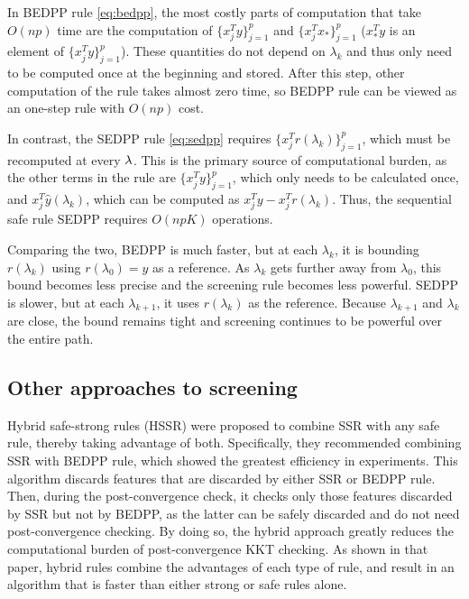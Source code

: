 In BEDPP rule \eqref{eq:bedpp}, the most costly parts of computation that take $O(np)$ time are the computation of $\{x_j^Ty\}_{j=1}^p$ and $\{x_j^Tx_*\}_{j=1}^p$ ($x_*^Ty$ is an element of $\{x_j^Ty\}_{j=1}^p$). These quantities do not depend on $\lambda_k$ and thus only need to be computed once at the beginning and stored. After this step, other computation of the rule takes almost zero time, so BEDPP rule can be viewed as an one-step rule with $O(np)$ cost.

In contrast, the SEDPP rule \eqref{eq:sedpp} requires $\{x_j^Tr(\lambda_k)\}_{j=1}^p$, which must be recomputed at every $\lambda$.  This is the primary source of computational burden, as the other terms in the rule are $\{x_j^Ty\}_{j=1}^p$, which only needs to be calculated once, and $x_j^T\hat{y}(\lambda_k)$, which can be computed as $x_j^Ty-x_j^Tr(\lambda_k)$. Thus, the sequential safe rule SEDPP requires $O(npK)$ operations.

Comparing the two, BEDPP is much faster, but at each $\lambda_k$, it is bounding $r(\lambda_k)$ using $r(\lambda_0)=y$ as a reference. As $\lambda_k$ gets further away from $\lambda_0$, this bound becomes less precise and the screening rule becomes less powerful. SEDPP is slower, but at each $\lambda_{k+1}$, it uses $r(\lambda_{k})$ as the reference. Because $\lambda_{k+1}$ and $\lambda_k$ are close, the bound remains tight and screening continues to be powerful over the entire path.

\subsection{Other approaches to screening}

Hybrid safe-strong rules (HSSR) \citep{Zeng2021} were proposed to combine SSR with any safe rule, thereby taking advantage of both. Specifically, they recommended combining SSR with BEDPP rule, which showed the greatest efficiency in experiments. This algorithm discards features that are discarded by either SSR or BEDPP rule. Then, during the post-convergence check, it checks only those features discarded by SSR but not by BEDPP, as the latter can be safely discarded and do not need post-convergence checking. By doing so, the hybrid approach greatly reduces the computational burden of post-convergence KKT checking.  As shown in that paper, hybrid rules combine the advantages of each type of rule, and result in an algorithm that is faster than either strong or safe rules alone.


